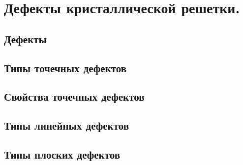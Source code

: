 \section{Дефекты кристаллической решетки. }
\subsection{Дефекты}
\subsection{Типы точечных дефектов}
\subsection{Свойства точечных дефектов}
\subsection{Типы линейных дефектов}
\subsection{Типы плоских дефектов}